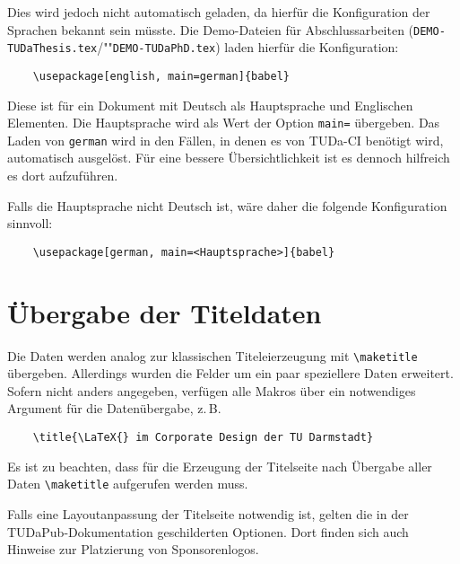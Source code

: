 \documentclass[
	german,%
	accentcolor=9c,%
	ruledheaders=chapter,%
	class=book,%
	thesis={%
			type=dr,
			dr=rernat
		},
	fontsize=11pt,%
	parskip=half-,%
	custommargins=true,%
	marginpar=false,%
]{tudapub}
\newcommand*{\file}[1]{\texttt{#1}}
\begin{document}
Dies wird jedoch nicht automatisch geladen, da hierfür die Konfiguration der Sprachen bekannt sein müsste. Die Demo-Dateien für Abschlussarbeiten (\file{DEMO-TUDaThesis.tex}/""\file{DEMO-TUDaPhD.tex}) laden hierfür die Konfiguration:
\begin{verbatim}
    \usepackage[english, main=german]{babel}
\end{verbatim}
Diese ist für ein Dokument mit Deutsch als Hauptsprache und Englischen Elementen.
Die Hauptsprache wird als Wert der Option \verb+main=+ übergeben.
Das Laden von \verb+german+ wird in den Fällen, in denen es von TUDa-CI benötigt wird, automatisch ausgelöst.
Für eine bessere Übersichtlichkeit ist es dennoch hilfreich es dort aufzuführen.

Falls die Hauptsprache nicht Deutsch ist, wäre daher die folgende Konfiguration sinnvoll:
\begin{verbatim}
    \usepackage[german, main=<Hauptsprache>]{babel}
\end{verbatim}

\section{Übergabe der Titeldaten}

Die Daten werden analog zur klassischen Titeleierzeugung mit \verb+\maketitle+ übergeben. Allerdings wurden die Felder um ein paar speziellere Daten erweitert. Sofern nicht anders angegeben, verfügen alle Makros über ein notwendiges Argument für die Datenübergabe, z.\,B.
\begin{verbatim}
    \title{\LaTeX{} im Corporate Design der TU Darmstadt}
\end{verbatim}
Es ist zu beachten, dass für die Erzeugung der Titelseite nach Übergabe aller Daten \verb+\maketitle+ aufgerufen werden muss.

Falls eine Layoutanpassung der Titelseite notwendig ist, gelten die in der TUDaPub-Dokumentation \cite{tudapub} geschilderten Optionen. Dort finden sich auch Hinweise zur Platzierung von Sponsorenlogos.
\end{document}
